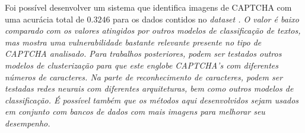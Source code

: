 \documentclass[11pt]{article}
\begin{document}
Foi possível desenvolver um sistema que identifica imagens de CAPTCHA com uma acurácia total de $0.3246$ para os dados contidos no \em dataset \em \cite{data}. O valor é baixo comparado com os valores atingidos por outros modelos de classificação de textos, mas mostra uma vulnerabilidade bastante relevante presente no tipo de CAPTCHA analisado. Para trabalhos posteriores, podem ser testados outros modelos de clusterização para que este englobe CAPTCHA’s com diferentes números de caracteres. Na parte de reconhecimento de caracteres, podem ser testadas redes neurais com diferentes arquiteturas, bem como outros modelos de classificação. É possível também que os métodos aqui desenvolvidos sejam usados em conjunto com bancos de dados com mais imagens para melhorar seu desempenho.

\nocite{15min} 
  

   
\end{document}
